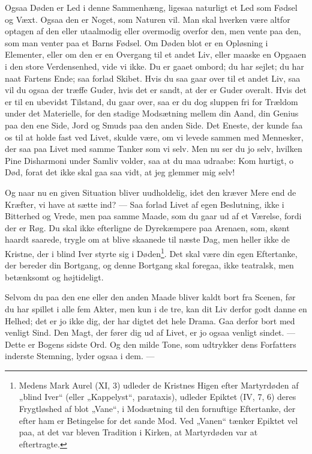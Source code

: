\documentclass[12pt,a4paper,openany]{book}
\newcommand{\opage}[1]{\marginnote{\footnotesize\textit{[#1]}}}
\begin{document}
Ogsaa Døden er Led i denne Sammenhæng, ligesaa naturligt
et Led som Fødsel og Væxt. Ogsaa den er Noget,
som Naturen vil. Man skal hverken være altfor optagen af
den eller utaalmodig eller overmodig overfor den, men vente
paa den, som man venter paa et Barns Fødsel. Om Døden
blot er en Opløsning i Elementer, eller om den er en Overgang
til et andet Liv, eller maaske en Opgaaen i den store
Verdensenhed, vide vi ikke. Du er gaaet ombord; du har
sejlet; du har naat Fartens Ende; saa forlad Skibet. Hvis du
saa gaar over til et andet Liv, saa vil du ogsaa der træffe
Guder, hvis det er sandt, at der er Guder overalt. Hvis det
er til en ubevidst Tilstand, du gaar over, saa er du dog sluppen
fri for Trældom under det Materielle, for den stadige Modsætning
mellem din Aand, din Genius paa den ene Side, Jord og
Smuds paa den anden Side. Det Eneste, der kunde faa os til
at holde fast ved Livet, skulde være, om vi levede sammen
med Mennesker, der saa paa Livet med samme Tanker som vi
\setcounter{footnote}{0}%
\opage{117}selv. Men nu ser du jo selv, hvilken Pine Disharmoni under
Samliv volder, saa at du maa udraabe: Kom hurtigt, o Død,
forat det ikke skal gaa saa vidt, at jeg glemmer mig selv!

Og naar nu en given Situation bliver uudholdelig, idet
den kræver Mere end de Kræfter, vi have at sætte ind?
--- Saa forlad Livet af egen Beslutning, ikke i Bitterhed og Vrede,
men paa samme Maade, som du gaar ud af et Værelse, fordi
der er Røg. Du skal ikke efterligne de Dyrekæmpere paa
Arenaen, som, skønt haardt saarede, trygle om at blive skaanede
til næste Dag, men heller ikke de Kristne, der i blind
Iver styrte sig i Døden\footnote[1]{Medens Mark Aurel (XI, 3) udleder de Kristnes Higen efter Martyrdøden af „blind Iver“ (eller „Kappelyst“, parataxis), udleder Epiktet (IV, 7, 6) deres Frygtløshed af blot „Vane“, i Modsætning til den fornuftige Eftertanke, der efter ham er Betingelse for det sande Mod. Ved „Vanen“ tænker Epiktet vel paa, at det var bleven Tradition i Kirken, at Martyrdøden var at eftertragte.}. Det skal være din egen Eftertanke,
der bereder din Bortgang, og denne Bortgang skal foregaa, ikke
teatralsk, men betænksomt og højtideligt.

Selvom du paa den ene eller den anden Maade bliver
kaldt bort fra Scenen, før du har spillet i alle fem Akter, men
kun i de tre, kan dit Liv derfor godt danne en Helhed; det
er jo ikke dig, der har digtet det hele Drama. Gaa derfor
bort med venligt Sind. Den Magt, der fører dig ud af Livet,
er jo ogsaa venligt sindet. --- Dette er Bogens sidste Ord. Og
den milde Tone, som udtrykker dens Forfatters inderste Stemning,
lyder ogsaa i dem. ---
\end{document}
